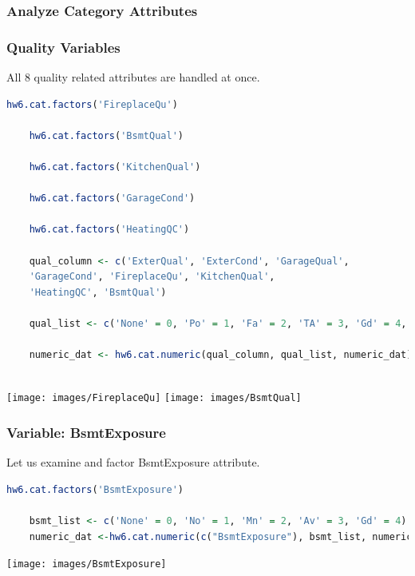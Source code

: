 \documentclass[sigconf]{acmart}
\begin{document}
	\subsubsection{Analyze Category Attributes}
	
	
	\subsubsection {Quality Variables}

	All 8 quality related attributes are handled at once.
	
	\begin{lstlisting}[language=R]
	hw6.cat.factors('FireplaceQu')
	
	hw6.cat.factors('BsmtQual')
	
	hw6.cat.factors('KitchenQual')
	
	hw6.cat.factors('GarageCond')
	
	hw6.cat.factors('HeatingQC')
	
	qual_column <- c('ExterQual', 'ExterCond', 'GarageQual', 
	'GarageCond', 'FireplaceQu', 'KitchenQual', 
	'HeatingQC', 'BsmtQual')
	
	qual_list <- c('None' = 0, 'Po' = 1, 'Fa' = 2, 'TA' = 3, 'Gd' = 4, 'Ex' = 5)
	
	numeric_dat <- hw6.cat.numeric(qual_column, qual_list, numeric_dat)
	
	\end{lstlisting}
	
	\begin{center}
		\texttt{[image: images/FireplaceQu]}
		\texttt{[image: images/BsmtQual]} 	
	\end{center}
	
	\subsubsection {Variable: BsmtExposure}
	
	
	Let us examine and factor BsmtExposure attribute.
	
	\begin{lstlisting}[language=R]
	hw6.cat.factors('BsmtExposure')
	
	bsmt_list <- c('None' = 0, 'No' = 1, 'Mn' = 2, 'Av' = 3, 'Gd' = 4)
	numeric_dat <-hw6.cat.numeric(c("BsmtExposure"), bsmt_list, numeric_dat)
	\end{lstlisting}
	
	\begin{center}
		\texttt{[image: images/BsmtExposure]}	
	\end{center}
	
\end{document}
